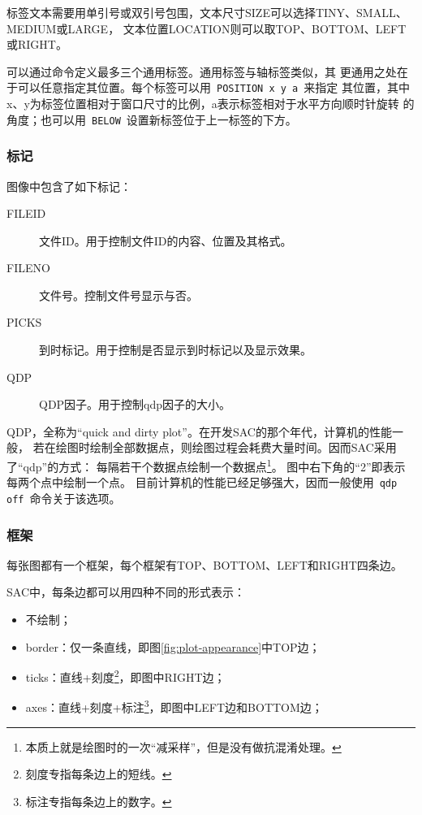 标签文本需要用单引号或双引号包围，文本尺寸SIZE可以选择TINY、SMALL、MEDIUM或LARGE，
文本位置LOCATION则可以取TOP、BOTTOM、LEFT或RIGHT。

可以通过命令定义最多三个通用标签。通用标签与轴标签类似，其
更通用之处在于可以任意指定其位置。每个标签可以用~\verb+POSITION x y a+~来指定
其位置，其中x、y为标签位置相对于窗口尺寸的比例，a表示标签相对于水平方向顺时针旋转
的角度；也可以用~\verb+BELOW+~设置新标签位于上一标签的下方。

\subsubsection{标记}
图像中包含了如下标记：
\begin{description}
\item [FILEID] 文件ID。用于控制文件ID的内容、位置及其格式。
\item [FILENO] 文件号。控制文件号显示与否。
\item [PICKS] 到时标记。用于控制是否显示到时标记以及显示效果。
\item [QDP] QDP因子。用于控制qdp因子的大小。
\end{description}

QDP，全称为``quick and dirty plot''。在开发SAC的那个年代，计算机的性能一般，
若在绘图时绘制全部数据点，则绘图过程会耗费大量时间。因而SAC采用了``qdp''的方式：
每隔若干个数据点绘制一个数据点\footnote{本质上就是绘图时的一次``减采样''，但是没有做抗混淆处理。}。
图中右下角的``2''即表示每两个点中绘制一个点。
目前计算机的性能已经足够强大，因而一般使用~\verb+qdp off+~命令关于该选项。

\subsubsection{框架}
每张图都有一个框架，每个框架有TOP、BOTTOM、LEFT和RIGHT四条边。

SAC中，每条边都可以用四种不同的形式表示：
\begin{itemize}
\item 不绘制；
\item border：仅一条直线，即图\ref{fig:plot-appearance}中TOP边；
\item ticks：直线+刻度\footnote{刻度专指每条边上的短线。}，即图中RIGHT边；
\item axes：直线+刻度+标注\footnote{标注专指每条边上的数字。}，即图中LEFT边和BOTTOM边；
\end{itemize}

